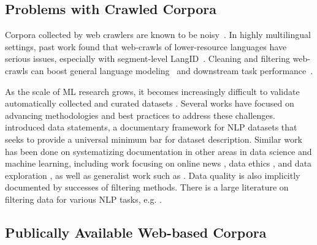 \subsection{Problems with Crawled Corpora}

Corpora collected by web crawlers are known to be noisy~\citep{junczys-dowmunt-2019-microsoft,luccioni-viviano-2021-whats}. In highly multilingual settings, past work found that web-crawls of lower-resource languages have serious issues, especially with segment-level LangID~\citep{caswell-etal-2020-language}. Cleaning and filtering web-crawls can boost general language modeling~\citep{gao-etal-2020-pile,brown-etal-2020-language,raffel-etal-2020-exploring} and downstream task performance~\citep{moore-lewis-2010-intelligent,rarrick-etal-2011-mt,xu-koehn-2017-zipporah,khayrallah-koehn-2018-impact,brown-etal-2020-language}.

As the scale of ML research grows, it becomes increasingly difficult to validate automatically collected and curated datasets \citep{biderman-etal-2020-pitfalls,birhane-etal-2021-large,bender-etal-2021-on}. Several works have focused on advancing methodologies and best practices to address these challenges. \citet{bender-friedman-2018-data} introduced data statements, a documentary framework for NLP datasets that seeks to provide a universal minimum bar for dataset description. Similar work has been done on systematizing documentation in other areas in data science and machine learning, including work focusing on online news \citep{kevin-etal-2018-information}, data ethics \citep{sun-etal-2019-mithralabel}, and data exploration \citep{holland-etal-2018-the}, as well as generalist work such as \citep{gebru-etal-2018-datasheets}. Data quality is also implicitly documented by successes of filtering methods. There is a large literature on filtering data for various NLP tasks, e.g. \citep{axelrod-etal-2011-domain,moore-lewis-2010-intelligent,rarrick-etal-2011-mt,wang-etal-2018-denoising,kamholz-etal-2014-panlex,junczys-dowmunt-2018-dual,caswell-etal-2020-language}.

\subsection{Publically Available Web-based Corpora}\label{sec:crawls}

